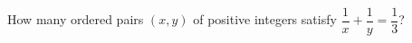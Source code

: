 How many ordered pairs $(x,y)$ of positive integers satisfy $\dfrac{1}{x}+\dfrac{1}{y}=\dfrac{1}{3}$?
